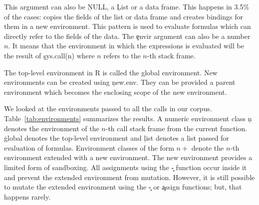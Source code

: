 \documentclass[USenglish,cleveref, autoref, thm-restate]{lipics-v2019}
\begin{document}
This argument can also be \c{NULL}, a \c{List} or a data frame. This happens
in 3.5\% of the cases: \eval copies the fields of the list or data frame
and creates bindings for them in a new environment. This pattern is used to
evaluate formulas which can directly refer to the fields of the data.  The
\c{envir} argument can also be a number $n$. It means that the environment
in which the expressions is evaluated will be the result of \c{sys.call(n)}
where $n$ refers to the $n$-th stack frame.

The top-level environment in R is called the global environment. New
environments can be created using \c{new.env}. They can be provided a parent
environment which becomes the enclosing scope of the new environment.

We looked at the environments passed to all the \eval calls in our corpus.
Table~\ref{tab:environments} summarizes the results. A numeric environment
class \c{n} denotes the environment of the $n$-th call stack frame from the
current function. \c{global} denotes the top-level environment and \c{list}
denotes a list passed for evaluation of formulas. Environment classes of the
form $n+$ denote the $n$-th environment extended with a new environment. The
new environment provides a limited form of sandboxing. All assignments using
the \c{\<-} function occur inside it and prevent the extended environment
from mutation. However, it is still possible to mutate the extended
environment using the \c{\<\<-} or \c{assign} functions; but, that happens
rarely.

\begin{table}[htbp]  \label{tab:environments}
\caption{Environments in terms of eval calls.}
\end{table}
\end{document}
